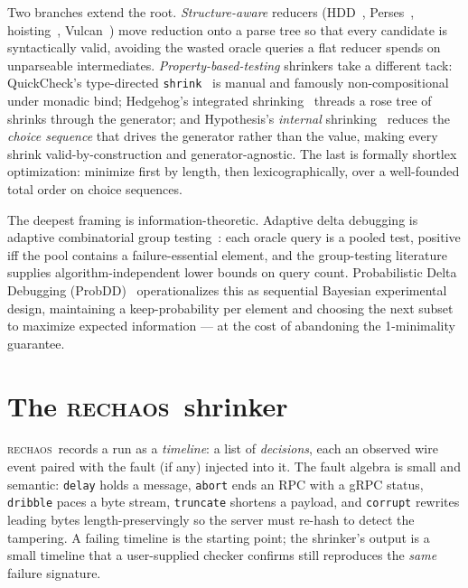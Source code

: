 \documentclass[10pt,twocolumn,letterpaper]{article}
\newcommand{\rc}{\textsc{rechaos}}
\newcommand{\tool}[1]{\texttt{#1}}
\begin{document}
Two branches extend the root. \emph{Structure-aware} reducers
(HDD~\cite{misherghi2006hdd}, Perses~\cite{sun2018perses},
hoisting~\cite{vince2021hoisting}, Vulcan~\cite{vulcan2023}) move reduction onto
a parse tree so that every candidate is syntactically valid, avoiding the wasted
oracle queries a flat reducer spends on unparseable intermediates.
\emph{Property-based-testing} shrinkers take a different tack: QuickCheck's
type-directed \texttt{shrink}~\cite{claessen2000quickcheck} is manual and
famously non-compositional under monadic bind; Hedgehog's integrated
shrinking~\cite{hedgehog} threads a rose tree of shrinks through the generator;
and Hypothesis's \emph{internal} shrinking~\cite{maciver2020hypothesis} reduces
the \emph{choice sequence} that drives the generator rather than the value,
making every shrink valid-by-construction and generator-agnostic. The last is
formally shortlex optimization: minimize first by length, then lexicographically,
over a well-founded total order on choice sequences.

The deepest framing is information-theoretic. Adaptive delta debugging is
adaptive combinatorial group testing~\cite{dorfman1943,aldridge2019grouptesting}:
each oracle query is a pooled test, positive iff the pool contains a
failure-essential element, and the group-testing literature supplies
algorithm-independent lower bounds on query count. Probabilistic Delta Debugging
(ProbDD)~\cite{wang2021probdd} operationalizes this as sequential Bayesian
experimental design, maintaining a keep-probability per element and choosing the
next subset to maximize expected information --- at the cost of abandoning the
1-minimality guarantee.

\section{The \rc\ shrinker}\label{sec:design}
\rc\ records a run as a \emph{timeline}: a list of \emph{decisions}, each an
observed wire event paired with the fault (if any) injected into it. The fault
algebra is small and semantic: \tool{delay} holds a message, \tool{abort} ends
an RPC with a gRPC status, \tool{dribble} paces a byte stream, \tool{truncate}
shortens a payload, and \tool{corrupt} rewrites leading bytes length-preservingly
so the server must re-hash to detect the tampering. A failing timeline is the
starting point; the shrinker's output is a small timeline that a user-supplied
checker confirms still reproduces the \emph{same} failure signature.
\end{document}
